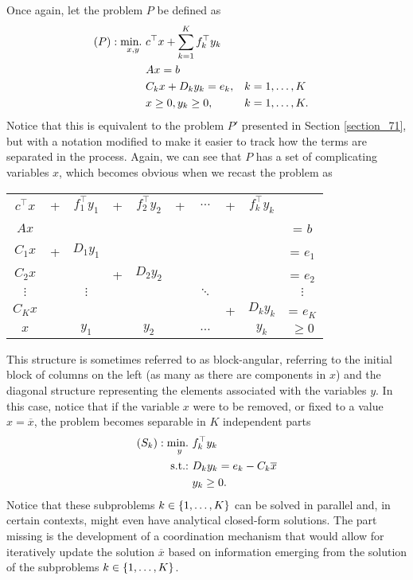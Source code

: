 Once again, let the problem $P$ be defined as
%
\begin{align*}
	(P) :\mathop{\text{min.~}}_{x,y} &c^\top x + \sum_{k=1}^K f_k^\top y_k \\
		  &Ax = b \\
		  &C_k x + D_k y_k = e_k,  & &k =1, \dots, K \\
		  &x \geq 0, y_k \geq 0, & &k = 1,\dots, K. 
\end{align*}
%
Notice that this is equivalent to the problem $P'$ presented in Section \ref{section_71}, but with a notation modified to make it easier to track how the terms are separated in the process. Again, we can see that $P$ has a set of complicating variables $x$, which becomes obvious when we recast the problem as
%
\begin{center}
\begin{tabular}{cccccccccc}
	 $c^\top x$ & + & $f_1^\top y_1$ & + & $f_2^\top y_2$ & + & $\dots$ & + & $f_k^\top y_k$  &  \\
 	 $Ax$       &   &                &   &                &   &         &   &                 & = $b$ \\
	 $C_1 x$    & + & $D_1 y_1$      &   &                &   &         &   &                 & = $e_1$  \\
	 $C_2 x$    &   &                & + & $D_2 y_2$      &   &         &   &                 & = $e_2$    \\
	 $\vdots$   &   &  $\vdots$      &   &                &   & $\ddots$&   &                 &  $\vdots$   \\
	 $C_K x$    &   &                &   &                &   &         & + & $D_k y_k$       & = $e_K$  \\
	 $x$        &   & $y_1$          &   &  $y_2$         &   & $\dots$ &   & $y_k$           & $\geq 0$  
\end{tabular}	
\end{center}
 
This structure is sometimes referred to as block-angular, referring to the initial block of columns on the left (as many as there are components in $x$) and the diagonal structure representing the elements associated with the variables $y$. In this case, notice that if the variable $x$ were to be removed, or fixed to a value $x = \overline{x}$, the problem becomes separable in $K$ independent parts
% 
\begin{align*} 
	(S_k) : \mathop{\text{min.~}}_y & f_k^\top y_k \\
	\mathop{\text{s.t.:~}} & D_ky_k = e_k - C_k \overline{x} \\
	& y_k \geq 0.
\end{align*}
%
Notice that these subproblems $k \in \left\{ 1,\dots, K \right \}$ can be solved in parallel and, in certain contexts, might even have analytical closed-form solutions. The part missing is the development of a coordination mechanism that would allow for iteratively update the solution $\overline{x}$ based on information emerging from the solution of the subproblems $k \in \left\{ 1,\dots, K \right \}$.

